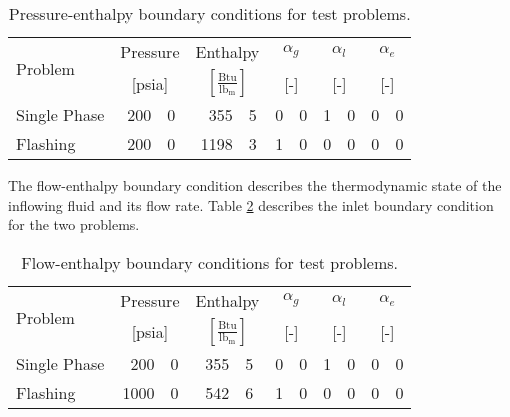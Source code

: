 \begin{table}[ht]
\centering
\begin{tabular}{@{}lr@{.}lr@{.}lr@{.}lr@{.}lr@{.}l@{}} \toprule
\multirow{2}{*}{Problem} & \multicolumn{2}{c}{Pressure} & \multicolumn{2}{c}{Enthalpy}             & \multicolumn{2}{c}{$\alpha_g$} & \multicolumn{2}{c}{$\alpha_l$} & \multicolumn{2}{c}{$\alpha_e$} \\ 
                         & \multicolumn{2}{c}{[psia]} & \multicolumn{2}{c}{$[\frac{\text{Btu}}{\text{lb}_{\text{m}}}]$} & \multicolumn{2}{c}{[-]}      & \multicolumn{2}{c}{[-]}      & \multicolumn{2}{c}{[-]}      \\ \midrule
Single Phase             &  200&0                       &  355&5                                   & 0&0                            & 1&0                            & 0&0 \\
Flashing                 &  200&0                       & 1198&3                                   & 1&0                            & 0&0                            & 0&0 \\ \bottomrule  
\end{tabular}
\caption{Pressure-enthalpy boundary conditions for test problems.}
\label{tab:bc_pe}
\end{table}

The flow-enthalpy boundary condition describes the thermodynamic state of the inflowing fluid and its flow rate.
Table \ref{tab:bc_fe} describes the inlet boundary condition for the two problems.

\begin{table}[ht]
\centering
\begin{tabular}{@{}lr@{.}lr@{.}lr@{.}lr@{.}lr@{.}l@{}} \toprule
\multirow{2}{*}{Problem} & \multicolumn{2}{c}{Pressure} & \multicolumn{2}{c}{Enthalpy}             & \multicolumn{2}{c}{$\alpha_g$} & \multicolumn{2}{c}{$\alpha_l$} & \multicolumn{2}{c}{$\alpha_e$} \\ 
                         & \multicolumn{2}{c}{[psia]} & \multicolumn{2}{c}{$[\frac{\text{Btu}}{\text{lb}_{\text{m}}}]$} & \multicolumn{2}{c}{[-]}      & \multicolumn{2}{c}{[-]}      & \multicolumn{2}{c}{[-]}      \\ \midrule
Single Phase             &  200&0                       &  355&5                                   & 0&0                            & 1&0                            & 0&0 \\
Flashing                 & 1000&0                       &  542&6                                   & 1&0                            & 0&0                            & 0&0 \\ \bottomrule  
\end{tabular}
\caption{Flow-enthalpy boundary conditions for test problems.}
\label{tab:bc_fe}
\end{table}

